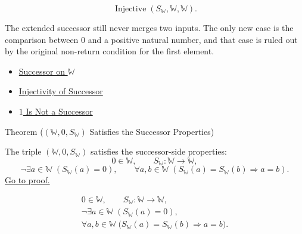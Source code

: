 \begin{remark*}
\[
\operatorname{Injective}(S_{\mathbb{W}},\mathbb{W},\mathbb{W}).
\]
\end{remark*}

\begin{remark*}[Interpretation]
The extended successor still never merges two inputs. The only new case is the
comparison between $0$ and a positive natural number, and that case is ruled
out by the original non-return condition for the first element.
\end{remark*}

\begin{dependencies}
\begin{itemize}
  \item \hyperref[def:successor-on-w]{Successor on $\mathbb{W}$}
  \item \hyperref[ax:peano-successor-injective]{Injectivity of Successor}
  \item \hyperref[ax:peano-base-not-successor]{$1$ Is Not a Successor}
\end{itemize}
\end{dependencies}

\begin{theorembox}{Theorem (\texorpdfstring{$(\mathbb{W},0,S_{\mathbb{W}})$}{(W,0,S_W)} Satisfies the Successor Properties)}
\begin{theorem}
\label{thm:w-successor-system-properties}
The triple $(\mathbb{W},0,S_{\mathbb{W}})$ satisfies the successor-side
properties:
\[
0\in\mathbb{W},\qquad
S_{\mathbb{W}}:\mathbb{W}\to\mathbb{W},
\]
\[
\neg\exists a\in\mathbb{W}\;(S_{\mathbb{W}}(a)=0),
\qquad
\forall a,b\in\mathbb{W}\;
(S_{\mathbb{W}}(a)=S_{\mathbb{W}}(b)\Longrightarrow a=b).
\]
\hyperref[prf:w-successor-system-properties]{Go to proof.}
\end{theorem}
\end{theorembox}

\begin{remark*}
\[
\begin{gathered}
0\in\mathbb{W},\qquad
S_{\mathbb{W}}:\mathbb{W}\to\mathbb{W},\\
\neg\exists a\in\mathbb{W}\;(S_{\mathbb{W}}(a)=0),\\
\forall a,b\in\mathbb{W}\;
\bigl(S_{\mathbb{W}}(a)=S_{\mathbb{W}}(b)\Longrightarrow a=b\bigr).
\end{gathered}
\]
\end{remark*}

